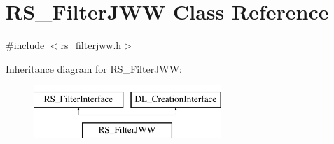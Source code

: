 \hypertarget{classRS__FilterJWW}{\section{R\-S\-\_\-\-Filter\-J\-W\-W Class Reference}
\label{classRS__FilterJWW}
}


{\ttfamily \#include $<$rs\-\_\-filterjww.\-h$>$}

Inheritance diagram for R\-S\-\_\-\-Filter\-J\-W\-W\-:\begin{figure}[H]
\begin{center}
\leavevmode
\includegraphics[height=2.000000cm]{classRS__FilterJWW}
\end{center}
\end{figure}

